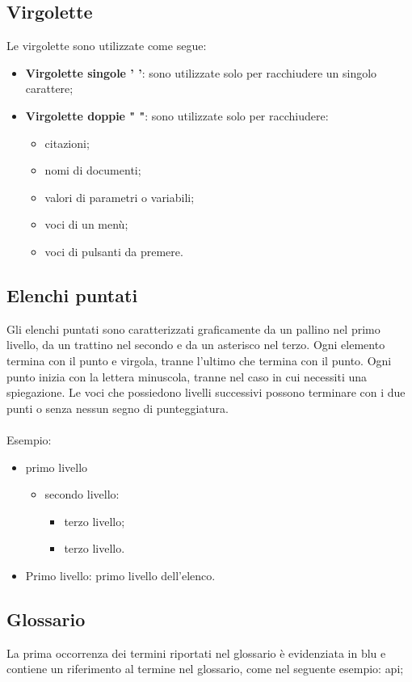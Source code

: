  \subsection{Virgolette}
 Le virgolette sono utilizzate come segue:
 \begin{itemize}
 	\item \textbf{Virgolette singole ' '}: sono utilizzate solo per racchiudere un singolo carattere;
 	\item \textbf{Virgolette doppie " "}: sono utilizzate solo per racchiudere:
 	\begin{itemize}
 		\item citazioni;
 		\item nomi di documenti;
 		\item valori di parametri o variabili;
 		\item voci di un menù;
 		\item voci di pulsanti da premere.
 	\end{itemize}
 \end{itemize}


\subsection{Elenchi puntati}
Gli elenchi puntati sono caratterizzati graficamente da un pallino nel primo livello, da un
trattino nel secondo e da un asterisco nel terzo.
Ogni elemento termina con il punto e virgola, tranne l'ultimo che termina con il punto. Ogni punto inizia con la lettera minuscola, tranne nel caso in cui necessiti una spiegazione.
Le voci che possiedono livelli successivi possono terminare con i due punti o senza nessun segno di punteggiatura.
\\
\\Esempio:
\begin{itemize}
	\item primo livello
		\begin{itemize}
			\item secondo livello:
			\begin{itemize}
				\item terzo livello;
				\item terzo livello.
			\end{itemize}
		\end{itemize}
	\item Primo livello: primo livello dell'elenco.
\end{itemize}


\subsection{Glossario}
La prima occorrenza dei termini riportati nel glossario è evidenziata in blu e contiene un riferimento al termine nel glossario, come nel seguente esempio: \gls{api};
